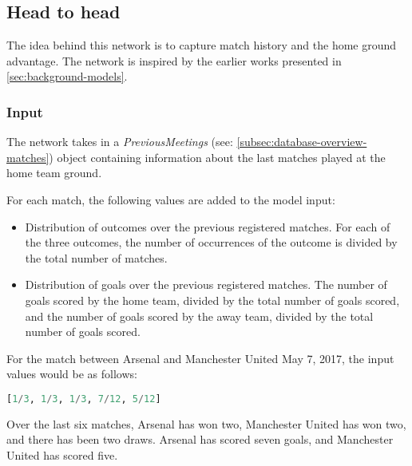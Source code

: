 \subsection{Head to head}
\label{subsec:head-to-head}

The idea behind this network is to capture match history and the home ground advantage. The network is inspired by the earlier works presented in \cref{sec:background-models}.


\subsubsection{Input}

The network takes in a \textit{PreviousMeetings} (see: \cref{subsec:database-overview-matches}) object containing information about the last matches played at the home team ground.

For each match, the following values are added to the model input:
\begin{itemize}[noitemsep]
    \item Distribution of outcomes over the previous registered matches. For each of the three outcomes, the number of occurrences of the outcome is divided by the total number of matches.
    \item Distribution of goals over the previous registered matches. The number of goals scored by the home team, divided by the total number of goals scored, and the number of goals scored by the away team, divided by the total number of goals scored.
\end{itemize}

For the match between Arsenal and Manchester United May 7, 2017, the input values would be as follows:
\begin{lstlisting}[language=Python]
    [1/3, 1/3, 1/3, 7/12, 5/12]
\end{lstlisting}
Over the last six matches, Arsenal has won two, Manchester United has won two, and there has been two draws. Arsenal has scored seven goals, and Manchester United has scored five.
